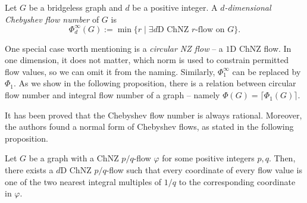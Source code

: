 \begin{definition}
Let $G$ be a bridgeless graph and $d$ be a positive integer. A \emph{$d$-dimensional Chebyshev flow number} of $G$ is
\begin{equation*}
\Phi_d^\infty(G) := \min\{r\mid\exists d\text{D ChNZ }r\text{-flow on }G\}.
\end{equation*}
\end{definition}

One special case worth mentioning is a \emph{circular NZ flow} – a $1$D ChNZ flow. In one dimension, it does not matter, which norm is used to constrain permitted flow values, so we can omit it from the naming. Similarly, $\Phi_1^\infty$ can be replaced by $\Phi_1$. As we show in the following proposition, there is a relation between circular flow number and integral flow number of a graph – namely $\Phi(G) = \lceil \Phi_1(G)\rceil$.

It has been proved \cite[p. 4]{preprint} that the Chebyshev flow number is always rational. Moreover, the authors found a normal form of Chebyshev flows, as stated in the following proposition.%

\begin{proposition} \emph{\cite[p. 6]{preprint}}
Let $G$ be a graph with a ChNZ $p/q$-flow $\varphi$ for some positive integers $p, q$. Then, there exists a $d$D ChNZ $p/q$-flow such that every coordinate of every flow value is one of the two nearest integral multiples of $1/q$ to the corresponding coordinate in $\varphi$. \label{prop:chebyshev_normal_form}
\end{proposition}

